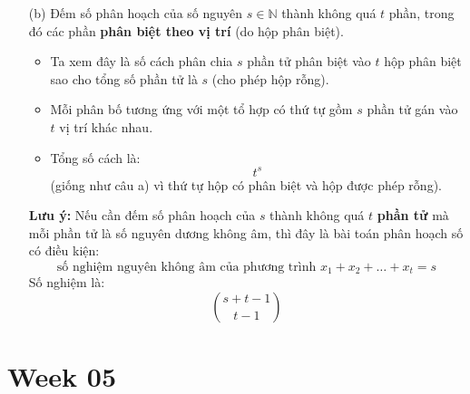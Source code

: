 \documentclass{article}
\begin{document}
	\begin{enumerate}
		\item[(b)] 
		Đếm số phân hoạch của số nguyên $s \in \mathbb{N}$ thành không quá $t$ phần, trong đó các phần \textbf{phân biệt theo vị trí} (do hộp phân biệt).
		
		\begin{itemize}
			\item Ta xem đây là số cách phân chia $s$ phần tử phân biệt vào $t$ hộp phân biệt sao cho tổng số phần tử là $s$ (cho phép hộp rỗng).
			\item Mỗi phân bố tương ứng với một tổ hợp có thứ tự gồm $s$ phần tử gán vào $t$ vị trí khác nhau.
			\item Tổng số cách là:
			\[
			\boxed{t^s}
			\]
			(giống như câu a) vì thứ tự hộp có phân biệt và hộp được phép rỗng).
		\end{itemize}
		
		\textbf{Lưu ý:} Nếu cần đếm số phân hoạch của $s$ thành không quá $t$ \textbf{phần tử} mà mỗi phần tử là số nguyên dương không âm, thì đây là bài toán phân hoạch số có điều kiện:
		\[
		\text{số nghiệm nguyên không âm của phương trình } x_1 + x_2 + \dots + x_t = s
		\]
		Số nghiệm là:
		\[
		\boxed{\binom{s + t - 1}{t - 1}}
		\]
	\end{enumerate}
	
	\newpage
	\section*{Week 05}
\end{document}
